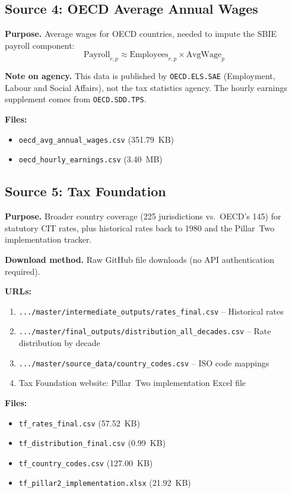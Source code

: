 \documentclass[12pt,a4paper]{article}
\begin{document}
\subsection{Source 4: OECD Average Annual Wages}\label{sec:src_wages}

\textbf{Purpose.}
Average wages for OECD countries, needed to impute the SBIE payroll component:
\[
\text{Payroll}_{r,p} \approx \text{Employees}_{r,p} \times \text{AvgWage}_p
\]

\textbf{Note on agency.}
This data is published by \texttt{OECD.ELS.SAE} (Employment, Labour and Social Affairs), not the tax statistics agency.
The hourly earnings supplement comes from \texttt{OECD.SDD.TPS}.

\textbf{Files:}
\begin{itemize}[nosep]
    \item \texttt{oecd\_avg\_annual\_wages.csv} (351.79~KB)
    \item \texttt{oecd\_hourly\_earnings.csv} (3.40~MB)
\end{itemize}


\subsection{Source 5: Tax Foundation}\label{sec:src_tf}

\textbf{Purpose.}
Broader country coverage (225 jurisdictions vs.\ OECD's 145) for statutory CIT rates, plus historical rates back to 1980 and the Pillar~Two implementation tracker.

\textbf{Download method.}
Raw GitHub file downloads (no API authentication required).

\textbf{URLs:}
\begin{enumerate}[nosep]
    \item \texttt{.../master/intermediate\_outputs/rates\_final.csv} -- Historical rates
    \item \texttt{.../master/final\_outputs/distribution\_all\_decades.csv} -- Rate distribution by decade
    \item \texttt{.../master/source\_data/country\_codes.csv} -- ISO code mappings
    \item Tax Foundation website: Pillar~Two implementation Excel file
\end{enumerate}

\textbf{Files:}
\begin{itemize}[nosep]
    \item \texttt{tf\_rates\_final.csv} (57.52~KB)
    \item \texttt{tf\_distribution\_final.csv} (0.99~KB)
    \item \texttt{tf\_country\_codes.csv} (127.00~KB)
    \item \texttt{tf\_pillar2\_implementation.xlsx} (21.92~KB)
\end{itemize}
\end{document}
